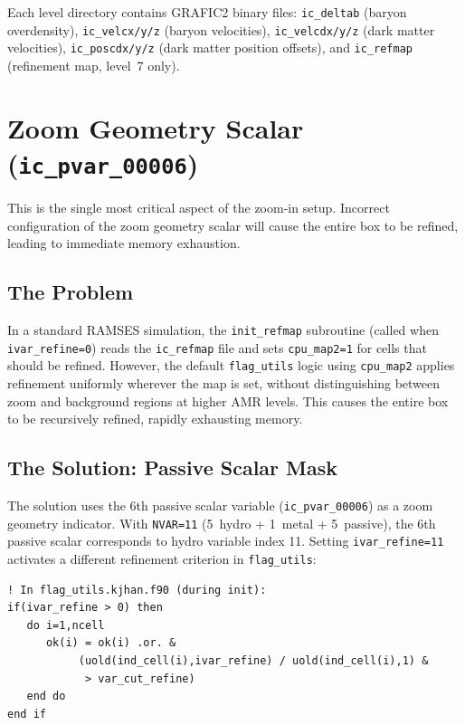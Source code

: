 \documentclass[11pt,fleqn]{book}
\begin{document}
Each level directory contains GRAFIC2 binary files: \texttt{ic\_deltab} (baryon overdensity), \texttt{ic\_velcx/y/z} (baryon velocities), \texttt{ic\_velcdx/y/z} (dark matter velocities), \texttt{ic\_poscdx/y/z} (dark matter position offsets), and \texttt{ic\_refmap} (refinement map, level~7 only).


\section{Zoom Geometry Scalar (\texttt{ic\_pvar\_00006})}

\begin{important}
This is the single most critical aspect of the zoom-in setup. Incorrect configuration of the zoom geometry scalar will cause the entire box to be refined, leading to immediate memory exhaustion.
\end{important}

\subsection{The Problem}

In a standard RAMSES simulation, the \texttt{init\_refmap} subroutine (called when \texttt{ivar\_refine=0}) reads the \texttt{ic\_refmap} file and sets \texttt{cpu\_map2=1} for cells that should be refined. However, the default \texttt{flag\_utils} logic using \texttt{cpu\_map2} applies refinement uniformly wherever the map is set, without distinguishing between zoom and background regions at higher AMR levels. This causes the entire box to be recursively refined, rapidly exhausting memory.

\subsection{The Solution: Passive Scalar Mask}

The solution uses the 6th passive scalar variable (\texttt{ic\_pvar\_00006}) as a zoom geometry indicator. With \texttt{NVAR=11} (5~hydro + 1~metal + 5~passive), the 6th passive scalar corresponds to hydro variable index 11. Setting \texttt{ivar\_refine=11} activates a different refinement criterion in \texttt{flag\_utils}:

\begin{lstlisting}[style=fortran,numbers=none]
! In flag_utils.kjhan.f90 (during init):
if(ivar_refine > 0) then
   do i=1,ncell
      ok(i) = ok(i) .or. &
           (uold(ind_cell(i),ivar_refine) / uold(ind_cell(i),1) &
            > var_cut_refine)
   end do
end if
\end{lstlisting}
\end{document}
